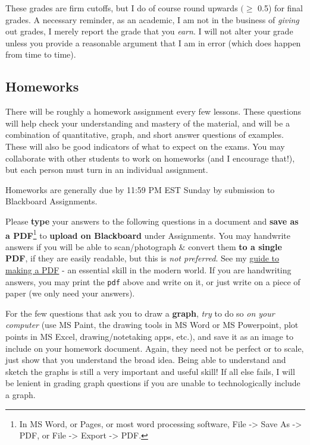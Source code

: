 \documentclass{article}
\begin{document}
These grades are firm cutoffs, but I do of course round upwards
\((\geq\) 0.5) for final grades. A necessary reminder, as an academic, I
am not in the business of \emph{giving} out grades, I merely report the
grade that you \emph{earn}. I will not alter your grade unless you
provide a reasonable argument that I am in error (which does happen from
time to time).

\hypertarget{homeworks}{%
\subsection*{Homeworks}\label{homeworks}}

There will be roughly a homework assignment every few lessons. These
questions will help check your understanding and mastery of the
material, and will be a combination of quantitative, graph, and short
answer questions of examples. These will also be good indicators of what
to expect on the exams. You may collaborate with other students to work
on homeworks (and I encourage that!), but each person must turn in an
individual assignment.

Homeworks are generally due by 11:59 PM EST Sunday by submission to
Blackboard Assignments.

Please \textbf{type} your answers to the following questions in a
document and \textbf{save as a PDF}\footnote{In MS Word, or Pages, or
  most word processing software, File -\textgreater{} Save As
  -\textgreater{} PDF, or File -\textgreater{} Export -\textgreater{}
  PDF.} to \textbf{upload on Blackboard} under Assignments. You may
handwrite answers if you will be able to scan/photograph \& convert them
\textbf{to a single PDF}, if they are easily readable, but this is
\emph{not preferred}. See my
\href{https://microS21.classes.ryansafner.com/resources/\#how-to-make-a-pdf-for-submitting-assignments}{guide
to making a PDF} - an essential skill in the modern world. If you are
handwriting answers, you may print the \texttt{pdf} above and write on
it, or just write on a piece of paper (we only need your answers).

For the few questions that ask you to draw a \textbf{graph}, \emph{try}
to do so \emph{on your computer} (use MS Paint, the drawing tools in MS
Word or MS Powerpoint, plot points in MS Excel, drawing/notetaking apps,
etc.), and save it as an image to include on your homework document.
Again, they need not be perfect or to scale, just show that you
understand the broad idea. Being able to understand and sketch the
graphs is still a very important and useful skill! If all else fails, I
will be lenient in grading graph questions if you are unable to
technologically include a graph.
\end{document}
